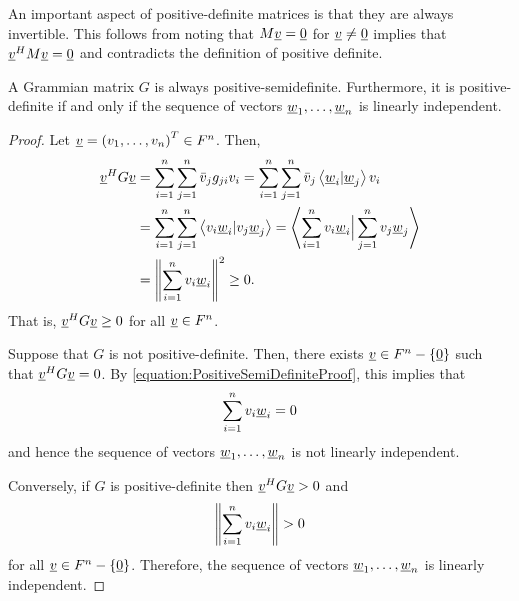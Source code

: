 An important aspect of positive-definite matrices is that they are always invertible.
This follows from noting that $M\underline{v} = \underline{0}$ for $\underline{v}\neq\underline{0}$ implies that $\underline{v}^H M \underline{v} = \underline{0}$ and contradicts the definition of positive definite.

\begin{theorem}
A Grammian matrix $G$ is always positive-semidefinite.
Furthermore, it is positive-definite if and only if the sequence of vectors $\underline{w}_1, \ldots, \underline{w}_n$ is linearly independent.
\end{theorem}
\begin{proof}
Let $\underline{v} = \left( v_1, \ldots, v_n \right)^T \in F^n$.
Then,
\begin{equation} \label{equation:PositiveSemiDefiniteProof}
\begin{split}
\underline{v}^H G \underline{v} &=
\sum_{i=1}^n \sum_{j=1}^n \bar{v}_j g_{ji} v_i
= \sum_{i=1}^n \sum_{j=1}^n \bar{v}_j \left\langle \underline{w}_i | \underline{w}_j \right\rangle v_i \\
&= \sum_{i=1}^n \sum_{j=1}^n \left\langle v_i \underline{w}_i | v_j \underline{w}_j \right\rangle
= \left\langle \sum_{i=1}^n v_i \underline{w}_i \Big| \sum_{j=1}^n v_j \underline{w}_j \right\rangle \\
&= \left\| \sum_{i=1}^n v_i \underline{w}_i \right\|^2
\geq 0.
\end{split}
\end{equation}
That is, $\underline{v}^H G \underline{v} \geq 0$ for all $\underline{v} \in F^n$.

Suppose that $G$ is not positive-definite.
Then, there exists $\underline{v} \in F^n - \left\{ \underline{0} \right\}$ such that $\underline{v}^H G \underline{v} = 0$.
By \eqref{equation:PositiveSemiDefiniteProof}, this implies that
\begin{equation*}
\sum_{i=1}^n v_i \underline{w}_i = 0
\end{equation*}
and hence the sequence of vectors $\underline{w}_1, \ldots, \underline{w}_n$ is not linearly independent.

Conversely, if $G$ is positive-definite then $\underline{v}^H G \underline{v} > 0$ and
\begin{equation*}
\left\| \sum_{i=1}^n v_i \underline{w}_i \right\| > 0
\end{equation*}
for all $\underline{v} \in F^n - \left\{ \underline{0} \right\}$.
Therefore, the sequence of vectors $\underline{w}_1, \ldots, \underline{w}_n$ is linearly independent.
\end{proof}


